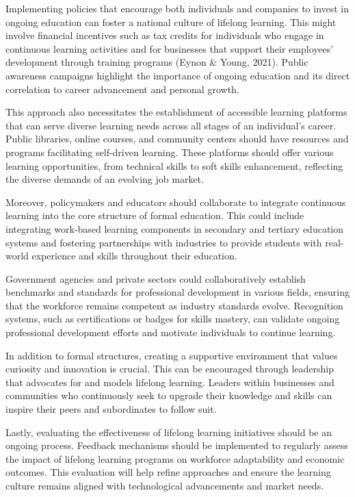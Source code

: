 \documentclass[11pt]{article}
\begin{document}
Implementing policies that encourage both individuals and companies to invest in ongoing education can foster a national culture of lifelong learning. This might involve financial incentives such as tax credits for individuals who engage in continuous learning activities and for businesses that support their employees' development through training programs (Eynon \& Young, 2021). Public awareness campaigns highlight the importance of ongoing education and its direct correlation to career advancement and personal growth.

This approach also necessitates the establishment of accessible learning platforms that can serve diverse learning needs across all stages of an individual’s career. Public libraries, online courses, and community centers should have resources and programs facilitating self-driven learning. These platforms should offer various learning opportunities, from technical skills to soft skills enhancement, reflecting the diverse demands of an evolving job market.

Moreover, policymakers and educators should collaborate to integrate continuous learning into the core structure of formal education. This could include integrating work-based learning components in secondary and tertiary education systems and fostering partnerships with industries to provide students with real-world experience and skills throughout their education.

Government agencies and private sectors could collaboratively establish benchmarks and standards for professional development in various fields, ensuring that the workforce remains competent as industry standards evolve. Recognition systems, such as certifications or badges for skills mastery, can validate ongoing professional development efforts and motivate individuals to continue learning.

In addition to formal structures, creating a supportive environment that values curiosity and innovation is crucial. This can be encouraged through leadership that advocates for and models lifelong learning. Leaders within businesses and communities who continuously seek to upgrade their knowledge and skills can inspire their peers and subordinates to follow suit.

Lastly, evaluating the effectiveness of lifelong learning initiatives should be an ongoing process. Feedback mechanisms should be implemented to regularly assess the impact of lifelong learning programs on workforce adaptability and economic outcomes. This evaluation will help refine approaches and ensure the learning culture remains aligned with technological advancements and market needs.
\end{document}
